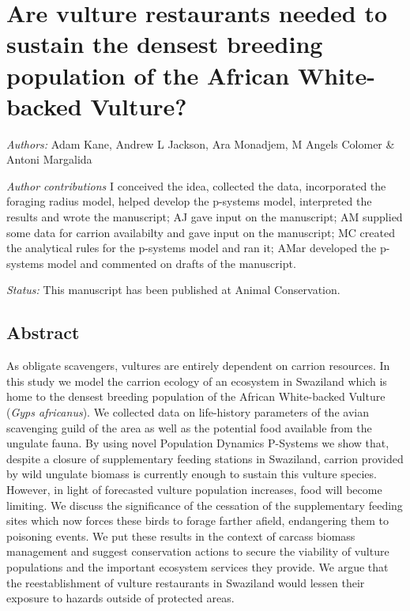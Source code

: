 \chapter{Are vulture restaurants needed to sustain the densest breeding population of the African White-backed Vulture?}
\label{chap:pdp}
\textit{Authors:} Adam Kane, Andrew L Jackson, Ara Monadjem, M Angels Colomer \& Antoni Margalida

\vspace{10 mm}

\noindent
\textit{\uppercase{A}uthor contributions} I conceived the idea, collected the data, incorporated the foraging radius model, helped develop the p-systems model, interpreted the results and wrote the manuscript; AJ gave input on the manuscript; AM supplied some data for carrion availabilty and gave input on the manuscript; MC created the analytical rules for the p-systems model and ran it; AMar developed the p-systems model and commented on drafts of the manuscript.


\vspace{10 mm}

\noindent
\textit{Status:} This manuscript has been published at Animal Conservation.
\newpage

\noindent

\section{\uppercase{A}bstract}

As obligate scavengers, vultures are entirely dependent on carrion resources. In this study we model the carrion ecology of an ecosystem in Swaziland which is home to the densest breeding population of the African White-backed Vulture (\textit{Gyps africanus}). We collected data on life-history parameters of the avian scavenging guild of the area as well as the potential food available from the ungulate fauna. By using novel Population Dynamics P-Systems we show that, despite a closure of supplementary feeding stations in Swaziland, carrion provided by wild ungulate biomass is currently enough to sustain this vulture species. However, in light of forecasted vulture population increases, food will become limiting. We discuss the significance of the cessation of the supplementary feeding sites which now forces these birds to forage farther afield, endangering them to poisoning events. We put these results in the context of carcass biomass management and suggest conservation actions to secure the viability of vulture populations and the important ecosystem services they provide. We argue that the reestablishment of vulture restaurants in Swaziland would lessen their exposure to hazards outside of protected areas.
\newpage

